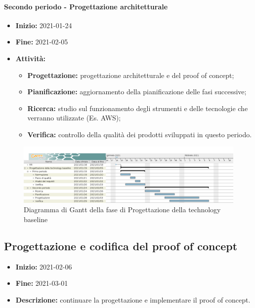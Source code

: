 \paragraph[Secondo periodo]{Secondo periodo - \textnormal{Progettazione architetturale}}
\begin{itemize}
    \item [] \textbf{Inizio:} 2021-01-24
    \item [] \textbf{Fine:} 2021-02-05
    \item [] \textbf{Attività:}
          \begin{itemize}
              \item \textbf{Progettazione:} progettazione architetturale e del proof of concept;
              \item \textbf{Pianificazione:} aggiornamento della pianificazione delle fasi successive;
              \item \textbf{Ricerca:} studio sul funzionamento degli strumenti e delle tecnologie che verranno utilizzate (Es. AWS);
              \item \textbf{Verifica:} controllo della qualità dei prodotti sviluppati in questo periodo.
          \end{itemize}
\end{itemize}

\begin{figure}[H]
    \centering
    \includegraphics[width=1\linewidth]{res/images/pianificazione/progettazione_della_technology_baseline.png}
    \caption{Diagramma di Gantt della fase di Progettazione della technology baseline}
    \label{fig:_Gantt progettazione della technology baseline}
\end{figure}


\subsection{Progettazione e codifica del proof of concept} \label{_pianificazioneCodificaPoC}
\begin{itemize}
    \item []\textbf{Inizio:} 2021-02-06
    \item []\textbf{Fine:} 2021-03-01
    \item []\textbf{Descrizione:} continuare la progettazione e implementare il proof of concept.
\end{itemize}


